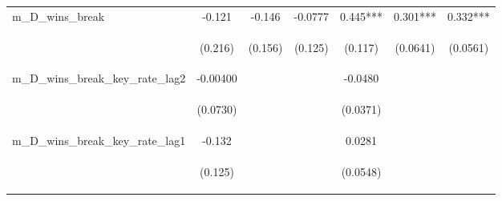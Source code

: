 \begin{tabular}{lcccccc}
m\_D\_wins\_break & -0.121 & -0.146 & -0.0777 & 0.445*** & 0.301*** & 0.332*** \\
\vspace{4pt} & \begin{footnotesize}(0.216)\end{footnotesize} & \begin{footnotesize}(0.156)\end{footnotesize} & \begin{footnotesize}(0.125)\end{footnotesize} & \begin{footnotesize}(0.117)\end{footnotesize} & \begin{footnotesize}(0.0641)\end{footnotesize} & \begin{footnotesize}(0.0561)\end{footnotesize} \\
m\_D\_wins\_break\_key\_rate\_lag2 & -0.00400 &  &  & -0.0480 &  &  \\
\vspace{4pt} & \begin{footnotesize}(0.0730)\end{footnotesize} & \begin{footnotesize}\end{footnotesize} & \begin{footnotesize}\end{footnotesize} & \begin{footnotesize}(0.0371)\end{footnotesize} & \begin{footnotesize}\end{footnotesize} & \begin{footnotesize}\end{footnotesize} \\
m\_D\_wins\_break\_key\_rate\_lag1 & -0.132 &  &  & 0.0281 &  &  \\
\vspace{4pt} & \begin{footnotesize}(0.125)\end{footnotesize} & \begin{footnotesize}\end{footnotesize} & \begin{footnotesize}\end{footnotesize} & \begin{footnotesize}(0.0548)\end{footnotesize} & \begin{footnotesize}\end{footnotesize} & \begin{footnotesize}\end{footnotesize} \\

\end{tabular}
